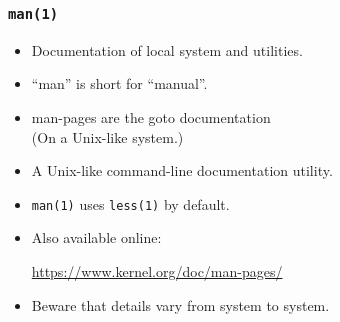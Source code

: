 \begin{frame}

\frametitle{\texttt{man(1)}}

\begin{itemize}

\item Documentation of local system and utilities.

\item ``man'' is short for ``manual''.

\item man-pages are the goto documentation \\ (On a Unix-like system.)

\item A Unix-like command-line documentation utility.

\end{itemize}

\vspace{\fill}

\begin{itemize}

\item \texttt{man(1)} uses \texttt{less(1)} by default.

\item Also available online:

\begin{center}

\url{https://www.kernel.org/doc/man-pages/}

\end{center}

\item Beware that details vary from system to system.

\end{itemize}

\end{frame}
